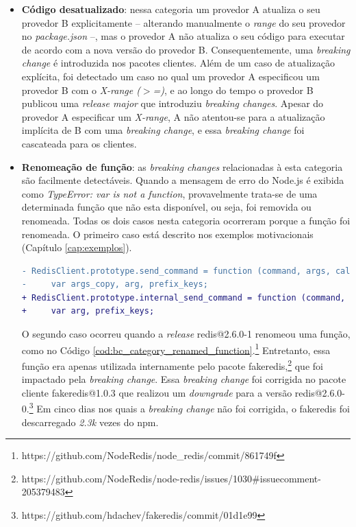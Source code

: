 \begin{itemize}
    \item \textbf{Código desatualizado}: nessa categoria um provedor \textsf{A} atualiza o seu provedor \textsf{B} explicitamente -- alterando manualmente o \textit{range} do seu provedor no \textit{package.json} --, mas o provedor \textsf{A} não atualiza o seu código para executar de acordo com a nova versão do provedor \textsf{B}. Consequentemente, uma \textit{breaking change} é introduzida nos pacotes clientes. Além de um caso de atualização explícita, foi detectado um caso no qual um provedor \textsf{A} especificou um provedor \textsf{B} com o \textit{X-range ($>$=)}, e ao longo do tempo o provedor \textsf{B} publicou uma \textit{release major} que introduziu \textit{breaking changes}. Apesar do provedor \textsf{A} especificar um \textit{X-range}, \textsf{A} não atentou-se para a atualização implícita de \textsf{B} com uma \textit{breaking change}, e essa \textit{breaking change} foi cascateada para os clientes.

    \item \textbf{Renomeação de função}: as \textit{breaking changes} relacionadas à esta categoria são facilmente detectáveis. Quando a mensagem de erro do \textsf{Node.js} é exibida como \textit{TypeError: var is not a function}, provavelmente trata-se de uma determinada função que não esta disponível, ou seja, foi removida ou renomeada. Todas os dois casos nesta categoria ocorreram porque a função foi renomeada. O primeiro caso está descrito nos exemplos motivacionais (Capítulo \ref{cap:exemplos}).
    \vspace{0.4cm}
	 \begin{lstlisting}[numbers=none, language=diff, label=cod:bc_category_renamed_function, caption={Exemplo da categoria \textit{Renomeação de função}}]
- RedisClient.prototype.send_command = function (command, args, callback) {
-     var args_copy, arg, prefix_keys;
+ RedisClient.prototype.internal_send_command = function (command, args, callback) {
+     var arg, prefix_keys;
	 \end{lstlisting}

    O segundo caso ocorreu quando a \textit{release} \textsf{redis@2.6.0-1} renomeou uma função, como no Código \ref{cod:bc_category_renamed_function}.\footnote{https://github.com/NodeRedis/node\_redis/commit/861749f} Entretanto, essa função era apenas utilizada internamente pelo pacote \textsf{fakeredis},\footnote{https://github.com/NodeRedis/node-redis/issues/1030\#issuecomment-205379483} que foi impactado pela \textit{breaking change}. Essa \textit{breaking change} foi corrigida no pacote cliente \textsf{fakeredis@1.0.3} que realizou um \textit{downgrade} para a versão \textsf{redis@2.6.0-0}.\footnote{https://github.com/hdachev/fakeredis/commit/01d1e99} Em cinco dias nos quais a \textit{breaking change} não foi corrigida, o \textsf{fakeredis} foi descarregado \textit{2.3k} vezes do \textsf{npm}.


\end{itemize}
